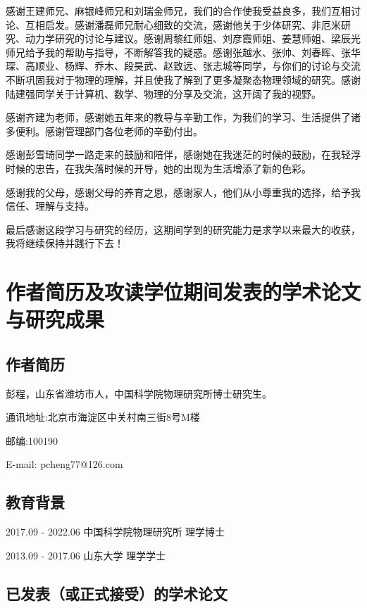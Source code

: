 感谢王建师兄、麻银峰师兄和刘瑞金师兄，我们的合作使我受益良多，我们互相讨论、互相启发。感谢潘磊师兄耐心细致的交流，感谢他关于少体研究、非厄米研究、动力学研究的讨论与建议。感谢周黎红师姐、刘彦霞师姐、姜慧师姐、梁辰光师兄给予我的帮助与指导，不断解答我的疑惑。感谢张越水、张帅、刘春晖、张华琛、高顺业、杨辉、乔木、段昊武、赵致远、张志城等同学，与你们的讨论与交流不断巩固我对于物理的理解，并且使我了解到了更多凝聚态物理领域的研究。感谢陆建强同学关于计算机、数学、物理的分享及交流，这开阔了我的视野。

感谢齐建为老师，感谢她五年来的教导与辛勤工作，为我们的学习、生活提供了诸多便利。感谢管理部门各位老师的辛勤付出。

感谢彭雪琦同学一路走来的鼓励和陪伴，感谢她在我迷茫的时候的鼓励，在我轻浮时候的忠告，在我失落时候的开导，她的出现为生活增添了新的色彩。

感谢我的父母，感谢父母的养育之恩，感谢家人，他们从小尊重我的选择，给予我信任、理解与支持。

最后感谢这段学习与研究的经历，这期间学到的研究能力是求学以来最大的收获，我将继续保持并践行下去！

\chapter{作者简历及攻读学位期间发表的学术论文与研究成果}


\section*{作者简历}

彭程，山东省潍坊市人，中国科学院物理研究所博士研究生。

通讯地址:北京市海淀区中关村南三街8号M楼 

邮编:100190

E-mail: pcheng77@126.com

\section*{教育背景}

2017.09 - 2022.06 中国科学院物理研究所 理学博士

2013.09 - 2017.06 山东大学 理学学士

\section*{已发表（或正式接受）的学术论文}

